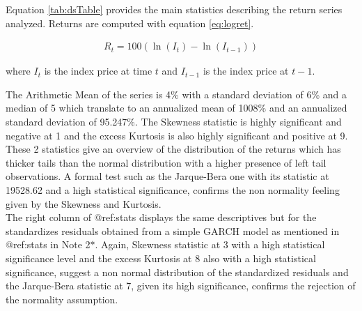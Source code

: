\documentclass[a4paper, twoside]{templates/ociamthesis}
\begin{document}
Equation \ref{tab:dsTable} provides the main statistics describing the return series analyzed. Returns are computed with equation \eqref{eq:logret}.

\begin{align}
R_{t}=100\left(\ln \left(I_{t}\right)-\ln \left(I_{t-1}\right)\right)
  \label{eq:logret}
\end{align}

\noindent where \(I_{t}\) is the index price at time \(t\) and \(I_{t-1}\) is the index price at \(t-1\).

\noindent The Arithmetic Mean of the series is 4\% with a standard deviation of 6\% and a median of 5 which translate to an annualized mean of 1008\% and an annualized standard deviation of 95.247\%. The Skewness statistic is highly significant and negative at 1 and the excess Kurtosis is also highly significant and positive at 9. These 2 statistics give an overview of the distribution of the returns which has thicker tails than the normal distribution with a higher presence of left tail observations. A formal test such as the Jarque-Bera one with its statistic at 19528.62 and a high statistical significance, confirms the non normality feeling given by the Skewness and Kurtosis. ~\\

\noindent The right column of @ref:stats displays the same descriptives but for the standardizes residuals obtained from a simple GARCH model as mentioned in @ref:stats in Note 2\(*\). Again, Skewness statistic at 3 with a high statistical significance level and the excess Kurtosis at 8 also with a high statistical significance, suggest a non normal distribution of the standardized residuals and the Jarque-Bera statistic at 7, given its high significance, confirms the rejection of the normality assumption.~\\
\end{document}
